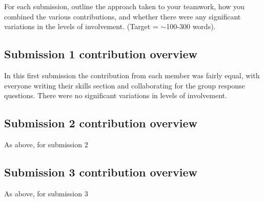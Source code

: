 \documentclass[a4paper, 11pt]{report}
\begin{document}
For each submission, outline the approach taken to your teamwork, how you combined the various contributions, and whether there were any significant variations in the levels of involvement. (Target = $\sim$100-300 words).

\subsection{Submission 1 contribution overview}

In this first submission the contribution from each member was fairly equal, with everyone writing their skills section and collaborating for the group response questions. There were no significant variations in levels of involvement.

\subsection{Submission 2 contribution overview}

As above, for submission 2

\subsection{Submission 3 contribution overview}

As above, for submission 3



\newpage


\end{document}
